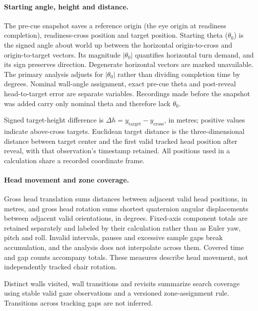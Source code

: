 \paragraph{Starting angle, height and distance.} The pre-cue snapshot saves a reference origin (the eye origin at readiness completion), readiness-cross position and target position. Starting theta ($\theta_0$) is the signed angle about world up between the horizontal origin-to-cross and origin-to-target vectors. Its magnitude $|\theta_0|$ quantifies horizontal turn demand, and its sign preserves direction. Degenerate horizontal vectors are marked unavailable. The primary analysis adjusts for $|\theta_0|$ rather than dividing completion time by degrees. Nominal wall-angle assignment, exact pre-cue theta and post-reveal head-to-target error are separate variables. Recordings made before the snapshot was added carry only nominal theta and therefore lack $\theta_0$.

Signed target-height difference is $\Delta h=y_{\mathrm{target}}-y_{\mathrm{cross}}$, in metres; positive values indicate above-cross targets. Euclidean target distance is the three-dimensional distance between target center and the first valid tracked head position after reveal, with that observation's timestamp retained. All positions used in a calculation share a recorded coordinate frame.

\paragraph{Head movement and zone coverage.} Gross head translation sums distances between adjacent valid head positions, in metres, and gross head rotation sums shortest quaternion angular displacements between adjacent valid orientations, in degrees. Fixed-axis component totals are retained separately and labeled by their calculation rather than as Euler yaw, pitch and roll. Invalid intervals, pauses and excessive sample gaps break accumulation, and the analysis does not interpolate across them. Covered time and gap counts accompany totals. These measures describe head movement, not independently tracked chair rotation.

Distinct walls visited, wall transitions and revisits summarize search coverage using stable valid gaze observations and a versioned zone-assignment rule. Transitions across tracking gaps are not inferred.

